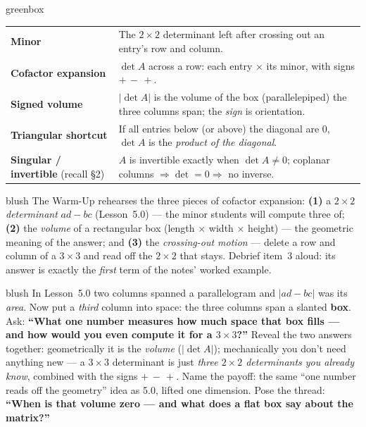 \documentclass[10pt]{article}
\begin{document}
\begin{skillbox}{greenbox}
\renewcommand{\arraystretch}{1.3}
\begin{tabularx}{\linewidth}{@{}l X@{}}
\textbf{Minor} & The $2\times2$ determinant left after crossing out an entry's row and column. \\
\textbf{Cofactor expansion} & $\det A$ across a row: each entry $\times$ its minor, with signs $+\,-\,+$. \\
\textbf{Signed volume} & $|\det A|$ is the volume of the box (parallelepiped) the three columns span; the \emph{sign} is orientation. \\
\textbf{Triangular shortcut} & If all entries below (or above) the diagonal are $0$, $\det A$ is the \emph{product of the diagonal}. \\
\textbf{Singular / invertible} (recall §2) & $A$ is invertible exactly when $\det A\ne0$; coplanar columns $\Rightarrow\det=0\Rightarrow$ no inverse. \\
\end{tabularx}
\end{skillbox}

\begin{fixedskillbox}{blush}
    The Warm-Up rehearses the three pieces of cofactor expansion:
    \textbf{(1)} a \emph{$2\times2$ determinant} $ad-bc$ (Lesson~5.0) --- the minor students will
    compute three of; \textbf{(2)} the \emph{volume} of a rectangular box (length $\times$ width
    $\times$ height) --- the geometric meaning of the answer; and \textbf{(3)} the \emph{crossing-out
    motion} --- delete a row and column of a $3\times3$ and read off the $2\times2$ that stays. Debrief
    item~3 aloud: its answer is exactly the \emph{first} term of the notes' worked example.
\end{fixedskillbox}

\begin{skillbox}[Hook]{blush}
    In Lesson~5.0 two columns spanned a parallelogram and $|ad-bc|$ was its \emph{area}. Now put a
    \emph{third} column into space: the three columns span a slanted \textbf{box}. Ask:
    \textbf{``What one number measures how much space that box fills --- and how would you even compute
    it for a $3\times3$?''} Reveal the two answers together: geometrically it is the \emph{volume}
    ($|\det A|$); mechanically you don't need anything new --- a $3\times3$ determinant is just
    \emph{three $2\times2$ determinants you already know}, combined with the signs $+\,-\,+$. Name the
    payoff: the same ``one number reads off the geometry'' idea as 5.0, lifted one dimension. Pose the
    thread: \textbf{``When is that volume zero --- and what does a flat box say about the matrix?''}
\end{skillbox}
\end{document}
